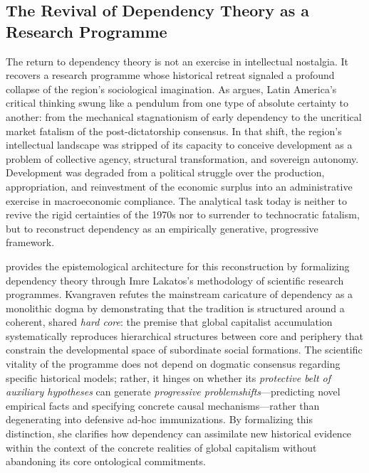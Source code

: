 \subsection{The Revival of Dependency Theory as a Research Programme}
\label{sec:A5_rev_deptheory}

The return to dependency theory is not an exercise in intellectual nostalgia. 
It recovers a research programme whose historical retreat signaled a profound collapse of the region's 
sociological imagination. As \citet{Palma2016} argues, Latin America's critical thinking swung like 
a pendulum from one type of absolute certainty to another: from the mechanical stagnationism of early 
dependency to the uncritical market fatalism of the post-dictatorship consensus. In that shift, the 
region's intellectual landscape was stripped of its capacity to conceive development as a problem of 
collective agency, structural transformation, and sovereign autonomy. Development was degraded from a 
political struggle over the production, appropriation, and reinvestment of the economic surplus into an 
administrative exercise in macroeconomic compliance. The analytical task today is neither to revive the 
rigid certainties of the 1970s nor to surrender to technocratic fatalism, but to reconstruct dependency 
as an empirically generative, progressive framework.

\citet{Kvangraven2021} provides the epistemological architecture for this reconstruction 
by formalizing dependency theory through Imre Lakatos's methodology of scientific research programmes. 
Kvangraven refutes the mainstream caricature of dependency as a monolithic dogma by demonstrating that 
the tradition is structured around a coherent, shared \textit{hard core}: the premise that global capitalist 
accumulation systematically reproduces hierarchical structures between core and periphery that constrain 
the developmental space of subordinate social formations. The scientific vitality of the programme does not depend on dogmatic consensus regarding specific historical models; rather, it hinges on whether its \textit{protective belt of auxiliary hypotheses} can generate \textit{progressive problemshifts}---predicting novel empirical facts and specifying concrete causal mechanisms---rather than degenerating into defensive ad-hoc immunizations. By formalizing this distinction, she clarifies how dependency can assimilate new historical evidence within the context of the concrete realities of global capitalism without abandoning its core ontological commitments.

